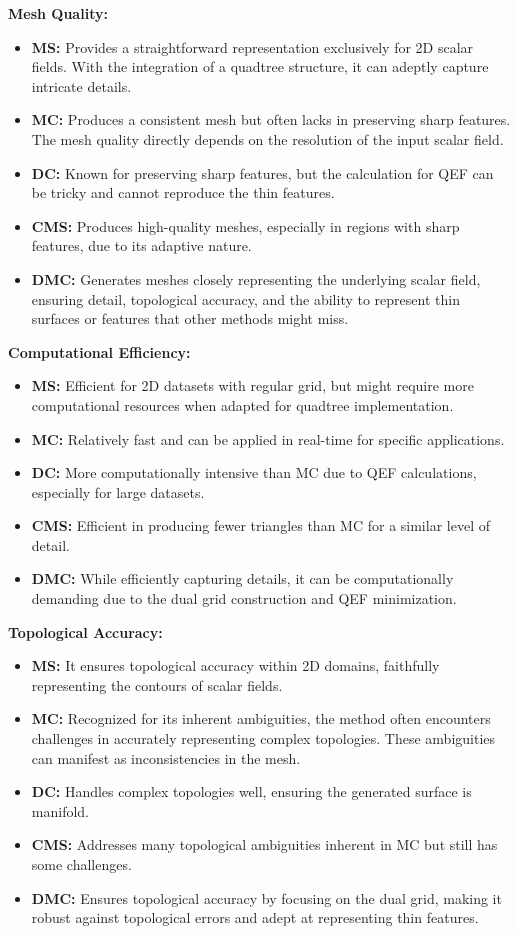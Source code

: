 \noindent \textbf{Mesh Quality:}
\begin{itemize}
\item \textbf{MS:} Provides a straightforward representation exclusively for 2D scalar fields. With the integration of a quadtree structure, it can adeptly capture intricate details.
\item \textbf{MC:} Produces a consistent mesh but often lacks in preserving sharp features. The mesh quality directly depends on the resolution of the input scalar field.
\item \textbf{DC:} Known for preserving sharp features, but the calculation for QEF can be tricky and cannot reproduce the thin features.
\item \textbf{CMS:} Produces high-quality meshes, especially in regions with sharp features, due to its adaptive nature.
\item \textbf{DMC:} Generates meshes closely representing the underlying scalar field, ensuring detail, topological accuracy, and the ability to represent thin surfaces or features that other methods might miss.
\end{itemize}

\noindent \textbf{Computational Efficiency:}
\begin{itemize}
\item \textbf{MS:} Efficient for 2D datasets with regular grid, but might require more computational resources when adapted for quadtree implementation.
\item \textbf{MC:} Relatively fast and can be applied in real-time for specific applications.
\item \textbf{DC:} More computationally intensive than MC due to QEF calculations, especially for large datasets.
\item \textbf{CMS:} Efficient in producing fewer triangles than MC for a similar level of detail.
\item \textbf{DMC:} While efficiently capturing details, it can be computationally demanding due to the dual grid construction and QEF minimization.
\end{itemize}

\noindent \textbf{Topological Accuracy:}
\begin{itemize}
\item \textbf{MS:} It ensures topological accuracy within 2D domains, faithfully representing the contours of scalar fields.
\item \textbf{MC:} Recognized for its inherent ambiguities, the method often encounters challenges in accurately representing complex topologies. These ambiguities can manifest as inconsistencies in the mesh. 
\item \textbf{DC:} Handles complex topologies well, ensuring the generated surface is manifold.
\item \textbf{CMS:} Addresses many topological ambiguities inherent in MC but still has some challenges.
\item \textbf{DMC:} Ensures topological accuracy by focusing on the dual grid, making it robust against topological errors and adept at representing thin features.
\end{itemize}

